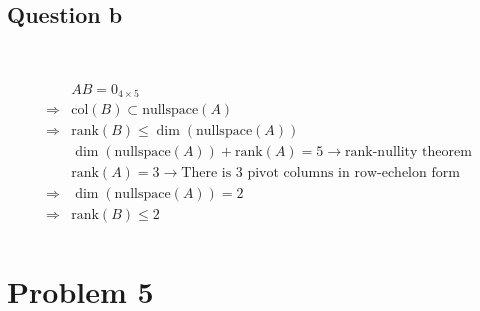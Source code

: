 \documentclass{article}
\def\rank{\text{rank}}
\begin{document}
\subsection{Question b}

~

\begin{equation*}
\begin{split}
&AB=0_{4\times5}\\
\Rightarrow&\text{col}(B)\subset\text{nullspace}(A)\\
\Rightarrow&\rank(B)\leq\dim(\text{nullspace}(A))\\
&\dim(\text{nullspace}(A))+\rank(A)=5\rightarrow\text{rank-nullity theorem}\\
&\rank(A)=3\rightarrow\text{There is 3 pivot columns in row-echelon form}\\
\Rightarrow&\dim(\text{nullspace}(A))=2\\
\Rightarrow&\rank(B)\leq2\\
\end{split}
\end{equation*}

\newpage

\section{Problem 5}

~
\end{document}
